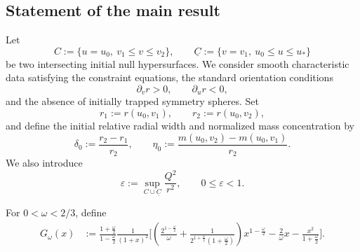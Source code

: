 \documentclass{article}[11pt]
\numberwithin{equation}{section}
\begin{document}
\subsection{Statement of the main result}

Let
\[
    C
    :=
    \{u=u_0,\ v_1\leq v\leq v_2\},
    \qquad
    \underline C
    :=
    \{v=v_1,\ u_0\leq u\leq u_*\}
\]
be two intersecting initial null hypersurfaces. We consider smooth
characteristic data satisfying the constraint equations, the standard
orientation conditions
\[
    \partial_vr>0,
    \qquad
    \partial_ur<0,
\]
and the absence of initially trapped symmetry spheres. Set 
\begin{equation}
    r_1:=r(u_0,v_1),
    \qquad
    r_2:=r(u_0,v_2),
\end{equation}
and define the initial relative radial width and normalized mass
concentration by
\begin{equation}
    \delta_0
    :=
    \frac{r_2-r_1}{r_2},
    \qquad
    \eta_0
    :=
    \frac{m(u_0,v_2)-m(u_0,v_1)}{r_2}.
    \label{eq:intro-eta-delta}
\end{equation}
We also introduce
\begin{equation}
    \varepsilon
    :=
    \sup_{C\cup\underline C}
    \frac{Q^2}{r^2},
    \qquad
    0\leq\varepsilon<1.
    \label{eq:intro-epsilon}
\end{equation}

\noindent For \(0<\omega<2/3\), define
\begin{equation}
\begin{split}
    G_\omega(x)
    &:=
    \frac{1+\frac{\omega}{2}}
         {1-\frac{\omega}{2}}
    \frac{1}{(1+x)^2}
    \Bigg[
       \left(
          \frac{2^{1-\frac{\omega}{2}}}{\omega}
          +
          \frac{1}
          {2^{1+\frac{\omega}{2}}
           \left(1+\frac{\omega}{2}\right)}
       \right)
       x^{1-\frac{\omega}{2}}
       -
       \frac{2}{\omega}x
       -
       \frac{x^2}{1+\frac{\omega}{2}}
    \Bigg].
\end{split}
\label{eq:intro-Gomega}
\end{equation}

\end{document}
